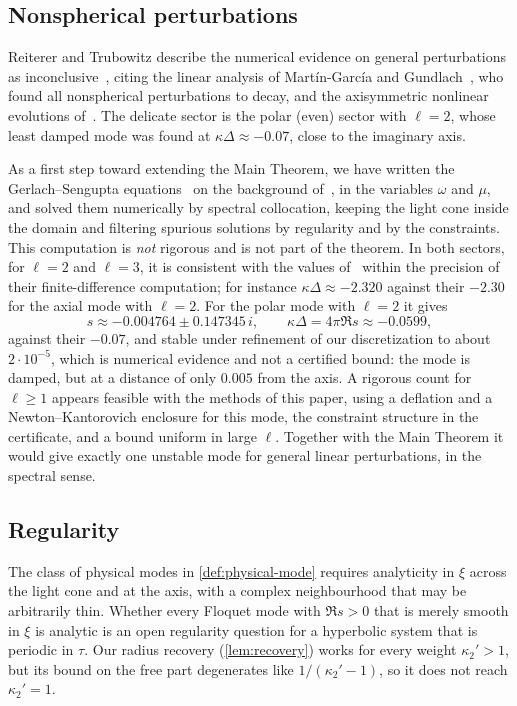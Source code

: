 \subsection{Nonspherical perturbations}

Reiterer and Trubowitz describe the numerical evidence on general perturbations as inconclusive~\cite{RT2019},
citing the linear analysis of Mart\'in-Garc\'ia and Gundlach~\cite{MartinGarciaGundlach1999}, who found all
nonspherical perturbations to decay, and the axisymmetric nonlinear evolutions
of~\cite{ChoptuikHirschmannLieblingPretorius2003}. The delicate sector is the polar (even) sector with $\ell=2$,
whose least damped mode was found at $\kappa\Delta\approx-0.07$, close to the imaginary axis.

As a first step toward extending the Main Theorem, we have written the Gerlach--Sengupta
equations~\cite{GerlachSengupta1979} on the background of~\cite{RT2019}, in the variables $\omega$ and $\mu$, and
solved them numerically by spectral collocation, keeping the light cone inside the domain and filtering spurious
solutions by regularity and by the constraints. This computation is \emph{not} rigorous and is not part of the
theorem. In both sectors, for $\ell=2$ and $\ell=3$, it is consistent with the values
of~\cite{MartinGarciaGundlach1999} within the precision of their finite-difference computation; for instance
$\kappa\Delta\approx-2.320$ against their $-2.30$ for the axial mode with $\ell=2$. For the polar mode with $\ell=2$
it gives
\[
  s\approx-0.004764\pm0.147345\,i,\qquad \kappa\Delta=4\pi\Re s\approx-0.0599,
\]
against their $-0.07$, and stable under refinement of our discretization to about $2\cdot10^{-5}$, which is
numerical evidence and not a certified bound: the mode is damped, but at a distance of only $0.005$ from the
axis. A rigorous count for $\ell\ge1$ appears feasible with the methods of this paper, using a deflation and a
Newton--Kantorovich enclosure for this mode, the constraint structure in the certificate, and a bound uniform in
large $\ell$. Together with the Main Theorem it would give exactly one unstable mode for general linear perturbations,
in the spectral sense.

\subsection{Regularity}\label{sec:discussion-regularity}

The class of physical modes in \cref{def:physical-mode} requires analyticity in $\xi$ across the light cone and
at the axis, with a complex neighbourhood that may be arbitrarily thin. Whether every Floquet mode with
$\Re s>0$ that is merely smooth in $\xi$ is analytic is an open regularity question for a hyperbolic system that is
periodic in $\tau$. Our radius recovery (\cref{lem:recovery}) works for every weight $\kappa_2'>1$, but its bound on
the free part degenerates like $1/(\kappa_2'-1)$, so it does not reach $\kappa_2'=1$.

